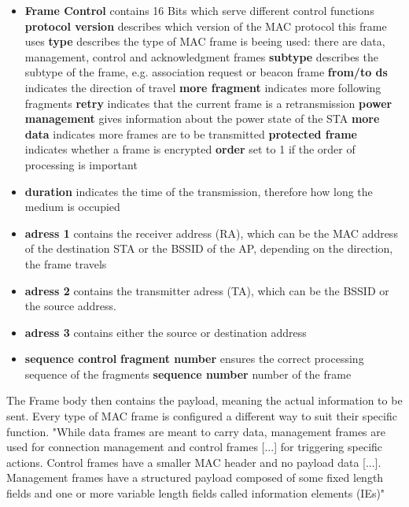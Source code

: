 \begin{itemize}
    \item \textbf{Frame Control} contains 16 Bits which serve different control functions
        \subitem \textbf{protocol version} describes which version of the MAC protocol this frame uses
        \subitem \textbf{type} describes the type of MAC frame is beeing used: there are data, management, control and acknowledgment frames
        \subitem \textbf{subtype} describes the subtype of the frame, e.g. association request or beacon frame
        \subitem \textbf{from/to ds} indicates the direction of travel
        \subitem \textbf{more fragment} indicates more following fragments
        \subitem \textbf{retry} indicates that the current frame is a retransmission
        \subitem \textbf{power management} gives information about the power state of the STA
        \subitem \textbf{more data} indicates more frames are to be transmitted 
        \subitem \textbf{protected frame} indicates whether a frame is encrypted
        \subitem \textbf{order} set to 1 if the order of processing is important
    \item \textbf{duration} indicates the time of the transmission, therefore how long the medium is occupied
    \item \textbf{adress 1} contains the receiver address (RA), which can be the MAC address of the destination STA or the BSSID of the AP, depending on the direction, the frame travels
    \item \textbf{adress 2} contains the transmitter adress (TA), which can be the BSSID or the source address.
    \item \textbf{adress 3} contains either the source or destination address
    \item \textbf{sequence control}
        \subitem \textbf{fragment number} ensures the correct processing sequence of the fragments
        \subitem \textbf{sequence number} number of the frame
\end{itemize} 

The Frame body then contains the payload, meaning the actual information to be sent.
Every type of MAC frame is configured a different way to suit their specific function.
"While data frames are meant to carry data, management frames are used for connection management and control frames [...] for triggering specific actions.
Control frames have a smaller MAC header and no payload data [...].
Management frames have a structured payload composed of some fixed length fields and one or more variable length fields called information elements (IEs)" \cite[page~12]{Sankaran_Gulasekaran_2021}

